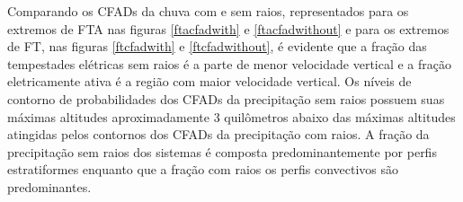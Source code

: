 
Comparando os CFADs da chuva com e sem raios, representados para os extremos de FTA nas figuras \ref{ftacfadwith} e \ref{ftacfadwithout} e para os extremos de FT, nas figuras \ref{ftcfadwith} e \ref{ftcfadwithout}, é evidente que a fração das tempestades elétricas sem raios é a parte de menor velocidade vertical e a fração eletricamente ativa é a região com maior velocidade vertical. Os níveis de contorno de probabilidades dos CFADs da precipitação sem raios possuem suas máximas altitudes aproximadamente 3 quilômetros abaixo das máximas altitudes atingidas pelos contornos dos CFADs da precipitação com raios. A fração da precipitação sem raios dos sistemas é composta predominantemente por perfis estratiformes enquanto que a fração com raios  os perfis convectivos são predominantes.




